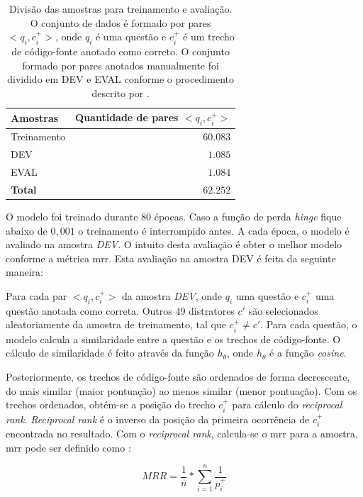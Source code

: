 \begin{table}[h]
\centering
\begin{tabular}{ p{3cm} r  }
 \hline
 \textbf{Amostras} & \textbf{Quantidade de pares $<q_{i}, c_{i}^{+}>$}\\
 \hline
 Treinamento & $60.083$\\
 
 DEV & $1.085$ \\
 
 EVAL & $1.084$\\
 \hline
 \textbf{Total} & $\bm{62.252}$\\
 \hline
\end{tabular}
\caption{Divisão das amostras para treinamento e avaliação. O conjunto de dados é formado por pares $<q_{i}, c_{i}^{+}>$, onde $q_{i}$ é uma questão e $c_{i}^{+}$ é um trecho de código-fonte anotado como correto. O conjunto formado por pares anotados manualmente foi dividido em DEV e EVAL conforme o procedimento descrito por \cite{iyer-etal-2016-summarizing}.}
\label{table:divisao-amostras}
\end{table}

O modelo foi treinado durante 80 épocas. Caso a função de perda \textit{hinge} fique abaixo de $0,001$ o treinamento é interrompido antes. A cada época, o modelo é avaliado na amostra \emph{DEV}. O intuito desta avaliação é obter o melhor modelo conforme a métrica \acrshort{mrr}. Esta avaliação na amostra DEV é feita da seguinte maneira:

Para cada par $<q_{i}, c_{i}^{+}>$ da amostra \emph{DEV}, onde $q_{i}$ uma questão e $c_{i}^{+}$ uma questão anotada como correta. Outros 49 distratores $c'$ são selecionados aleatoriamente da amostra de treinamento, tal que $c_{i}^{+} \neq c'$. Para cada questão, o modelo calcula a similaridade entre a questão e os trechos de código-fonte. O cálculo de similaridade é feito através da função $h_{\theta}$, onde $h_{\theta}$ é a função \textit{cosine}. 

Posteriormente, os trechos de código-fonte são ordenados de forma decrescente, do mais similar (maior pontuação) ao menos similar (menor pontuação). Com os trechos ordenados, obtém-se a posição do trecho $c_{i}^{+}$ para cálculo do \textit{reciprocal rank}. \textit{Reciprocal rank} é o inverso da posição da primeira ocorrência de $c_{i}^{+}$ encontrada no resultado. Com o \textit{reciprocal rank}, calcula-se o \acrshort{mrr} para a amostra. \acrshort{mrr} pode ser definido como \citep{Gu-deep-code-search:2018}:

\begin{equation}
MRR = \frac{1}{n} * \sum_{i = 1}^{n}\frac{1}{p_{i}^{+}}    
\end{equation}



